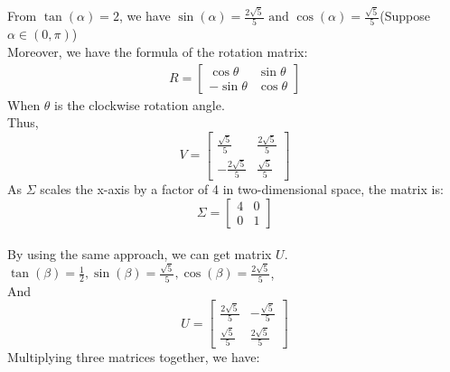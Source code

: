 \documentclass{article}
\begin{document}
\subsection{}\label{sub:} %
From $ \tan(\alpha  ) = 2 $, we have $ \sin(\alpha ) = \frac{2\sqrt{5}}{5} \text { and  } \cos(\alpha  ) = \frac{\sqrt5}{5} $(Suppose $ \alpha \in (0, \pi) $)\\
Moreover, we have the formula of the rotation matrix:
\begin{align*}
    R = \begin{bmatrix}
    \cos\theta  & \sin\theta  \\
    -\sin\theta  & \cos\theta
    \end{bmatrix}
\end{align*} 
When $ \theta $ is the clockwise rotation angle. \\
Thus, $$ V = \begin{bmatrix}
\frac{\sqrt5 }{5} & \frac{2\sqrt{5}}{5} \\
-\frac{2\sqrt{5}}{5} & \frac{\sqrt 5 }{5}
\end{bmatrix} $$
As $ \Sigma  $ scales the x-axis by a factor of 4 in two-dimensional space, the matrix is: $$ \Sigma = \begin{bmatrix}
4 & 0 \\
0 & 1
\end{bmatrix} $$ \\
By using the same approach, we can get matrix $ U $. $ \tan(\beta) = \frac{1}{2}, \sin(\beta) = \frac{\sqrt{5}}{5}, \cos(\beta) = \frac{2 \sqrt{5}}{5} $,\\
And $$ U = \begin{bmatrix}
\frac{2 \sqrt{5}}{5} & -\frac{\sqrt{5}}{5} \\
\frac{\sqrt{5}}{5} & \frac{2 \sqrt{5}}{5}
\end{bmatrix} $$
Multiplying three matrices together, we have:
\end{document}
